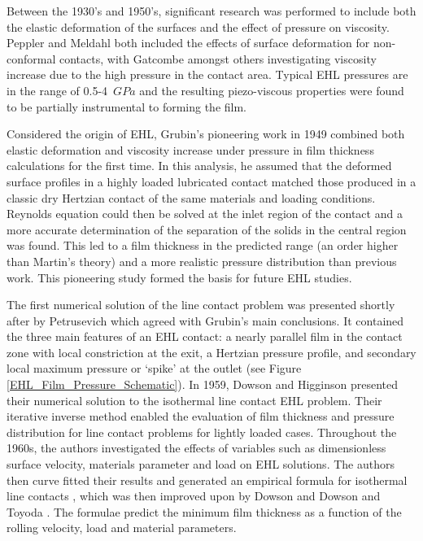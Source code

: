 Between the 1930’s and 1950’s, significant research was performed to include both the elastic deformation of the surfaces and the effect of pressure on viscosity. Peppler \cite{Peppler1936} and Meldahl \cite{Meldahl1941} both included the effects of surface deformation for non-conformal contacts, with Gatcombe \cite{Gatcombe1945} amongst others investigating viscosity increase due to the high pressure in the contact area. Typical EHL pressures are in the range of 0.5-4~$GPa$ and the resulting piezo-viscous properties were found to be partially instrumental to forming the film.

Considered the origin of EHL, Grubin’s pioneering work in 1949 \cite{Grubin1949} combined both elastic deformation and viscosity increase under pressure in film thickness calculations for the first time. In this analysis, he assumed that the deformed surface profiles in a highly loaded lubricated contact matched those produced in a classic dry Hertzian contact of the same materials and loading conditions. Reynolds equation could then be solved at the inlet region of the contact and a more accurate determination of the separation of the solids in the central region was found. This led to a film thickness in the predicted range (an order higher than Martin’s theory) and a more realistic pressure distribution than previous work. This pioneering study formed the basis for future EHL studies.

The first numerical solution of the line contact problem was presented shortly after by Petrusevich \cite{Petrusovich1951} which agreed with Grubin’s main conclusions. It contained the three main features of an EHL contact: a nearly parallel film in the contact zone with local constriction at the exit, a Hertzian pressure profile, and secondary local maximum pressure or ‘spike’ at the outlet (see Figure \ref{EHL_Film_Pressure_Schematic}). In 1959, Dowson and Higginson \cite{Dowson1959} presented their numerical solution to the isothermal line contact EHL problem. Their iterative inverse method enabled the evaluation of film thickness and pressure distribution for line contact problems for lightly loaded cases. Throughout the 1960s, the authors investigated the effects of variables such as dimensionless surface velocity, materials parameter and load on EHL solutions. The authors then curve fitted their results and generated an empirical formula for isothermal line contacts \cite{Dowson1961}, which was then improved upon by Dowson \cite{Dowson1966} and Dowson and Toyoda \cite{Dowson1979}. The formulae predict the minimum film thickness as a function of the rolling velocity, load and material parameters.

